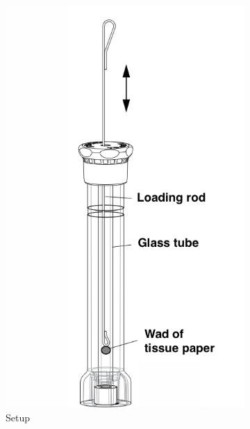 \begin{figure}
	\centering
	\begin{subfigure}{0.48\textwidth}
		\includegraphics[width=0.9\linewidth]{./Exp10/pic/adiabsetup}
		\caption{Setup}
	\end{subfigure}
\begin{subfigure}{0.48\textwidth}
	\centering

\end{subfigure}
\end{figure}
